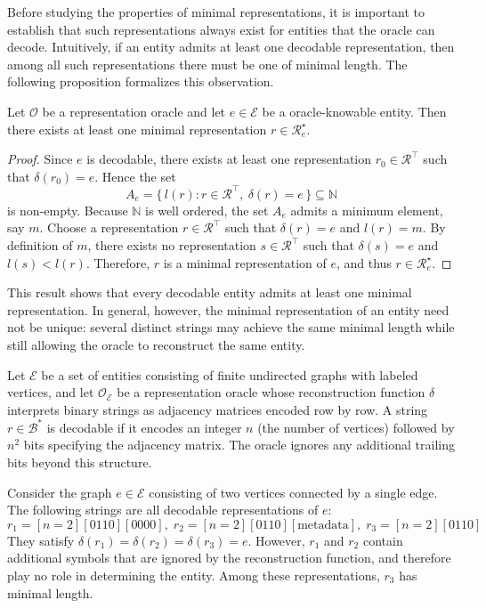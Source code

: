 Before studying the properties of minimal representations, it is important to establish that such representations always exist for entities that the oracle can decode. Intuitively, if an entity admits at least one decodable representation, then among all such representations there must be one of minimal length. The following proposition formalizes this observation.

\begin{proposition}
Let $\mathcal{O}$ be a representation oracle and let $e \in \mathcal{E}$ be a oracle-knowable entity. Then there exists at least one minimal representation $r \in \mathcal{R}^{\star}_{e}$.
\end{proposition}

\begin{proof}
Since $e$ is decodable, there exists at least one representation $r_0 \in \mathcal{R}^{\top}$ such that $\delta(r_0)=e$. Hence the set
\[
A_e = \{\, l(r) : r \in \mathcal{R}^{\top},\ \delta(r)=e \,\} \subseteq \mathbb{N}
\]
is non-empty. Because $\mathbb{N}$ is well ordered, the set $A_e$ admits a minimum element, say $m$. Choose a representation $r \in \mathcal{R}^{\top}$ such that $\delta(r)=e$ and $l(r)=m$. By definition of $m$, there exists no representation $s \in \mathcal{R}^{\top}$ such that $\delta(s)=e$ and $l(s) < l(r)$. Therefore, $r$ is a minimal representation of $e$, and thus $r \in \mathcal{R}^{\star}_{e}$.
\end{proof}

This result shows that every decodable entity admits at least one minimal representation. In general, however, the minimal representation of an entity need not be unique: several distinct strings may achieve the same minimal length while still allowing the oracle to reconstruct the same entity.

\begin{example}
Let $\mathcal{E}$ be a set of entities consisting of finite undirected graphs with labeled vertices, and let $\mathcal{O}_{\mathcal{E}}$ be a representation oracle whose reconstruction function $\delta$ interprets binary strings as adjacency matrices encoded row by row. A string $r \in \mathcal{B}^\ast$ is decodable if it encodes an integer $n$ (the number of vertices) followed by $n^2$ bits specifying the adjacency matrix. The oracle ignores any additional trailing bits beyond this structure.

Consider the graph $e \in \mathcal{E}$ consisting of two vertices connected by a single edge. The following strings are all decodable representations of $e$:
\[
r_1 = [n=2][0110][0000], \;
r_2 = [n=2][0110][\text{metadata}], \;
r_3 = [n=2][0110]
\]
They satisfy $\delta(r_1)=\delta(r_2)=\delta(r_3)=e$. However, $r_1$ and $r_2$ contain additional symbols that are ignored by the reconstruction function, and therefore play no role in determining the entity. Among these representations, $r_3$ has minimal length.
\end{example}

